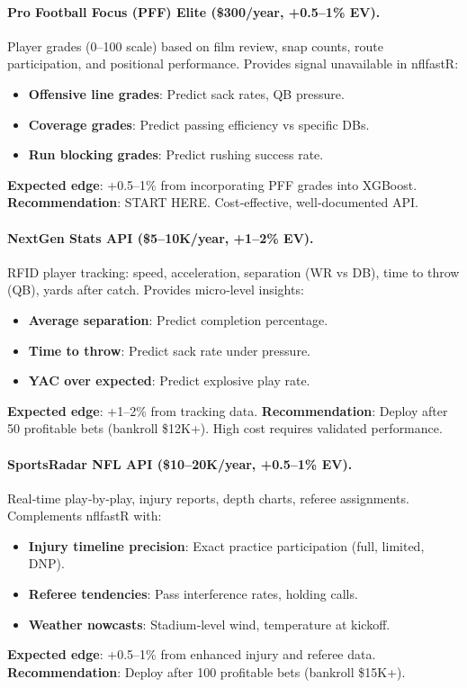 \paragraph{Pro Football Focus (PFF) Elite (\$300/year, +0.5--1\% EV).}
Player grades (0--100 scale) based on film review, snap counts, route participation, and positional performance. Provides signal unavailable in nflfastR:
\begin{itemize}
\item \textbf{Offensive line grades}: Predict sack rates, QB pressure.
\item \textbf{Coverage grades}: Predict passing efficiency vs specific DBs.
\item \textbf{Run blocking grades}: Predict rushing success rate.
\end{itemize}
\textbf{Expected edge}: +0.5--1\% from incorporating PFF grades into XGBoost. \textbf{Recommendation}: START HERE. Cost‑effective, well‑documented API.

\paragraph{NextGen Stats API (\$5--10K/year, +1--2\% EV).}
RFID player tracking: speed, acceleration, separation (WR vs DB), time to throw (QB), yards after catch. Provides micro‑level insights:
\begin{itemize}
\item \textbf{Average separation}: Predict completion percentage.
\item \textbf{Time to throw}: Predict sack rate under pressure.
\item \textbf{YAC over expected}: Predict explosive play rate.
\end{itemize}
\textbf{Expected edge}: +1--2\% from tracking data. \textbf{Recommendation}: Deploy after 50 profitable bets (bankroll \$12K+). High cost requires validated performance.

\paragraph{SportsRadar NFL API (\$10--20K/year, +0.5--1\% EV).}
Real‑time play‑by‑play, injury reports, depth charts, referee assignments. Complements nflfastR with:
\begin{itemize}
\item \textbf{Injury timeline precision}: Exact practice participation (full, limited, DNP).
\item \textbf{Referee tendencies}: Pass interference rates, holding calls.
\item \textbf{Weather nowcasts}: Stadium‑level wind, temperature at kickoff.
\end{itemize}
\textbf{Expected edge}: +0.5--1\% from enhanced injury and referee data. \textbf{Recommendation}: Deploy after 100 profitable bets (bankroll \$15K+).

